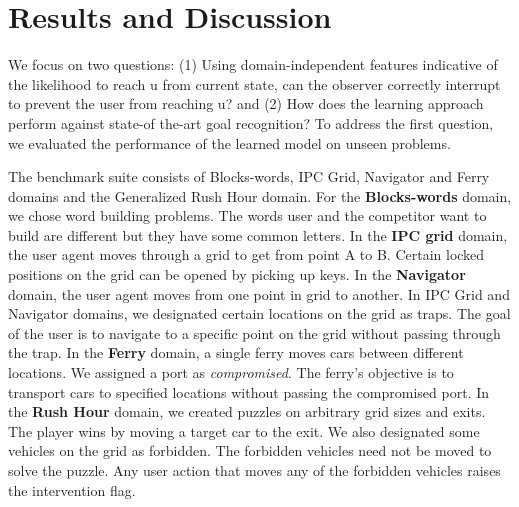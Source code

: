 \documentclass[letterpaper]{article}
\theoremstyle{plain}
\begin{document}
\section{Results and Discussion}
We focus on two questions: (1) Using domain-independent features indicative of the likelihood to reach $\mathrm{u}$ from current state, can the observer correctly interrupt to prevent the user from reaching $\mathrm{u}$? and (2) How does the learning approach perform against state-of the-art goal recognition? To address the first question, we evaluated the performance of the learned model on unseen problems.

The benchmark suite consists of Blocks-words, IPC Grid, Navigator and Ferry domains and the Generalized Rush Hour domain. For the \textbf{Blocks-words} domain, we chose word building problems. The words user and the competitor want to build are different but they have some common letters. In the \textbf{IPC grid} domain, the user agent moves through a grid to get from point A to B. Certain locked positions on the grid can be opened by picking up keys. In the \textbf{Navigator} domain, the user agent moves from one point in grid to another. In IPC Grid and Navigator domains, we designated certain locations on the grid as traps. The goal of the user is to navigate to a specific point on the grid without passing through the trap. In the \textbf{Ferry} domain, a single ferry moves cars between different locations. We assigned a port as \emph{compromised}. The ferry's objective is to transport cars to specified locations without passing the compromised port. In the \textbf{Rush Hour} domain, we created puzzles on arbitrary grid sizes and exits. The player wins by moving a target car to the exit. We also designated some vehicles on the grid as forbidden. The forbidden vehicles need not be moved to solve the puzzle. Any user action that moves any of the forbidden vehicles raises the intervention flag.
\end{document}
